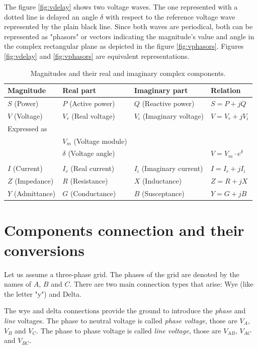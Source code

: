\documentclass[a4paper,twoside,fleqn]{tufte-book}
\begin{document}
The figure \ref{fig:vdelay} shows two voltage waves. The one represented with a dotted line is delayed an angle $\delta$ with respect to the reference voltage wave represented by the plain black line. Since both waves are periodical, both can be represented as "phasors" or vectors indicating the magnitude's value and angle in the complex rectangular plane as depicted in the figure \ref{fig:vphasors}. Figures \ref{fig:vdelay} and \ref{fig:vphasors} are equivalent representations.


\begin{table}[h]
\begin{center}
\footnotesize
\begin{tabular}{llll}
\toprule
Magnitude & Real part & Imaginary part & Relation\\
\midrule
$S$ (Power) & $P$ (Active power) & $Q$ (Reactive power) & $S=P +jQ$\\
$V$ (Voltage) & $V_r$ (Real voltage) & $V_i$ (Imaginary voltage) & $V=V_r +jV_i$\\
Expressed as  &  &  & \\
 & $V_m$ (Voltage module) &  & \\
 & $\delta$ (Voltage angle) &  & $V = V_m \cdot e^\delta$\\
  &  &  & \\
$I$ (Current) & $I_r$ (Real current) & $I_i$ (Imaginary current) & $I=I_r +jI_i$\\
$Z$ (Impedance) & $R$ (Resistance) & $X$ (Inductance) & $Z=R +jX$\\
$Y$ (Admittance) & $G$ (Conductance) & $B$ (Susceptance) & $Y=G +jB$\\
\bottomrule
\end{tabular}
\end{center}
  \caption{Magnitudes and their real and imaginary complex components.}
  \label{real_imaginary_table}
\end{table}






\section{Components connection and their conversions}

Let us assume a three-phase grid. The phases of the grid are denoted by the names of $A$, $B$ and $C$. There are two main connection types that arise: Wye (like the letter "y") and Delta.

The wye and delta connections provide the ground to introduce the \textit{phase} and \textit{line} voltages. The phase to neutral voltage is called \textit{phase voltage}, those are $V_A$, $V_B$ and $V_C$. The phase to phase voltage is called \textit{line voltage}, those are $V_{AB}$, $V_{AC}$ and $V_{BC}$.
\end{document}
